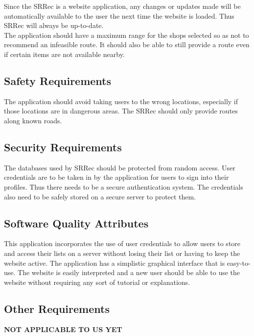 \documentclass[10pt, a4paper, onecolumn]{scrartcl}
\begin{document}
			Since the SRRec is a website application, any changes or updates made will be automatically available to the user the next time the website is loaded. Thus SRRec will always be up-to-date.\\
		
			The application should have a maximum range for the shops selected so as not to recommend an infeasible route. It should also be able to still provide a route even if certain items are not available nearby.
		
		\subsection{Safety Requirements}
		
			The application should avoid taking users to the wrong locations, especially if those locations are in dangerous areas. The SRRec should only provide routes along known roads.
		
		\subsection{Security Requirements}
		
			The databases used by SRRec should be protected from random access. User credentials are to be taken in by the application for users to sign into their profiles. Thus there needs to be a secure authentication system. The credentials also need to be safely stored on a secure server to protect them.
		
		\subsection{Software Quality Attributes}
			
			This application incorporates the use of user credentials to allow users to store and access their lists on a 	server without losing their list or having to keep the website active. The application has a simplistic graphical interface that is easy-to-use. The website is easily interpreted and a new user should be able to use the website without requiring any sort of tutorial or explanations.
		
		\subsection{Other Requirements}
		
			\textbf{NOT APPLICABLE TO US YET}
		
	
	
	
\end{document}

